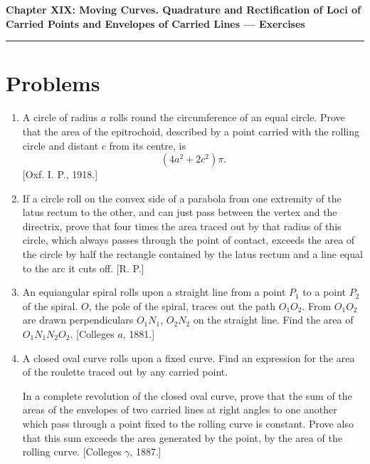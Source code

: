 \documentclass[11pt, a4paper]{article}
\newcommand{\source}[1]{\hfill\textnormal{[#1]}}
\begin{document}
\newpage

\begin{center}
    {\LARGE \bfseries \color{accent} Chapter XIX: Moving Curves. Quadrature and Rectification of Loci of Carried Points and Envelopes of Carried Lines --- Exercises}\\
    \vspace{0.2cm}
    {\color{accent}\rule{0.55\linewidth}{0.8pt}}
\end{center}
\vspace{0.35cm}

\section*{Problems}

\begin{enumerate}[leftmargin=2em]

\item A circle of radius $a$ rolls round the circumference of an equal circle. Prove that the area of the epitrochoid, described by a point carried with the rolling circle and distant $c$ from its centre, is
\[
(4a^2+2c^2)\pi.
\]
\source{Oxf. I. P., 1918.}

\item If a circle roll on the convex side of a parabola from one extremity of the latus rectum to the other, and can just pass between the vertex and the directrix, prove that four times the area traced out by that radius of this circle, which always passes through the point of contact, exceeds the area of the circle by half the rectangle contained by the latus rectum and a line equal to the arc it cuts off. \source{R. P.}

\item An equiangular spiral rolls upon a straight line from a point $P_1$ to a point $P_2$ of the spiral. $O$, the pole of the spiral, traces out the path $O_1O_2$. From $O_1O_2$ are drawn perpendiculars $O_1N_1$, $O_2N_2$ on the straight line. Find the area of $O_1N_1N_2O_2$. \source{Colleges $a$, 1881.}

\item A closed oval curve rolls upon a fixed curve. Find an expression for the area of the roulette traced out by any carried point.

In a complete revolution of the closed oval curve, prove that the sum of the areas of the envelopes of two carried lines at right angles to one another which pass through a point fixed to the rolling curve is constant. Prove also that this sum exceeds the area generated by the point, by the area of the rolling curve. \source{Colleges $\gamma$, 1887.}


\end{enumerate}
\end{document}
